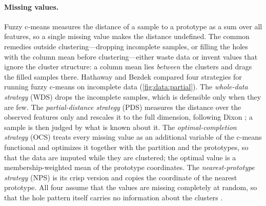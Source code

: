 \paragraph{Missing values.} Fuzzy c-means measures the distance of a sample to a prototype as a sum over all features, so a single missing value makes the distance undefined. The common remedies outside clustering---dropping incomplete samples, or filling the holes with the column mean before clustering---either waste data or invent values that ignore the cluster structure: a column mean lies \emph{between} the clusters and drags the filled samples there. Hathaway and Bezdek \cite{hathaway:2001:incomplete} compared four strategies for running fuzzy c-means on incomplete data (\cref{fig:data:partial}). The \emph{whole-data strategy} (WDS) drops the incomplete samples, which is defensible only when they are few. The \emph{partial-distance strategy} (PDS) measures the distance over the observed features only and rescales it to the full dimension, following Dixon \cite{dixon:1979:missing}; a sample is then judged by what is known about it. The \emph{optimal-completion strategy} (OCS) treats every missing value as an additional variable of the c-means functional and optimizes it together with the partition and the prototypes, so that the data are imputed while they are clustered; the optimal value is a membership-weighted mean of the prototype coordinates. The \emph{nearest-prototype strategy} (NPS) is its crisp version and copies the coordinate of the nearest prototype. All four assume that the values are missing completely at random, so that the hole pattern itself carries no information about the clusters \cite{little:2002:missing}.

